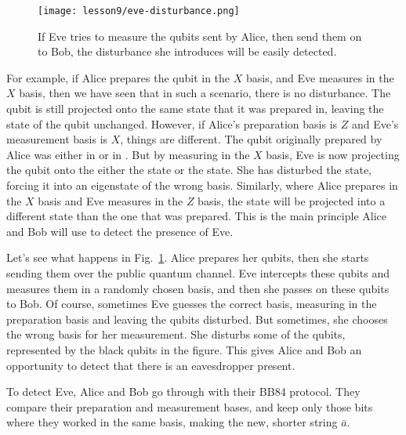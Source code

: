 \begin{figure}[H]
    \centering
    \texttt{[image: lesson9/eve-disturbance.png]}
        \caption[Eve's measurements disturb the qubits]{If Eve tries to measure  the qubits sent by Alice, then send them on to Bob, the disturbance she introduces will be easily detected.}
    \label{fig:eve-disturbance}
\end{figure}

For example, if Alice prepares the qubit in the $X$ basis, and Eve measures in the $X$ basis, then we have seen that in such a scenario, there is no disturbance. The qubit is still projected onto the same state that it was prepared in, leaving the state of the qubit unchanged. However, if Alice's preparation basis is $Z$ and Eve's measurement basis is $X$, things are different. The qubit originally prepared by Alice was either in  or in .  But by measuring in the $X$ basis, Eve is now projecting the qubit onto the either the \ket{+} state or the \ket{-} state. She has disturbed the state, forcing it into an eigenstate of the wrong basis. Similarly, where Alice prepares in the $X$ basis and Eve measures in the $Z$ basis, the state will be projected into a different state than the one that was prepared. This is the main principle Alice and Bob will use to detect the presence of Eve.


Let's see what happens in Fig.~\ref{fig:eve-disturbance}. Alice prepares her qubits, then she starts sending them over the public quantum channel. Eve intercepts these qubits and measures them in a randomly chosen basis, and then she passes on these qubits to Bob. Of course, sometimes Eve guesses the correct basis, measuring in the preparation basis and leaving the qubits disturbed. But sometimes, she chooses the wrong basis for her measurement. She disturbs some of the qubits, represented by the black qubits in the figure. This gives Alice and Bob an opportunity to detect that there is an eavesdropper present.

To detect Eve, Alice and Bob go through with their BB84 protocol. They compare their preparation and measurement bases, and keep only those bits where they worked in the same basis, making the new, shorter string $\bar{a}$.

